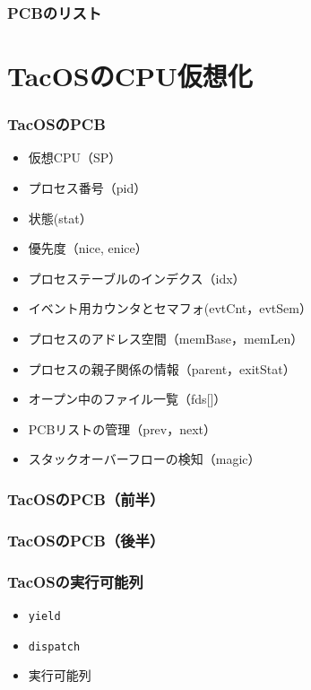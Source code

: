 \documentclass[unicode]{beamer}                   %
\begin{document}
\begin{frame}
  \frametitle{PCBのリスト}
\end{frame}

\section{TacOSのCPU仮想化}
\begin{frame}
  \frametitle{TacOSのPCB}
  \begin{itemize}
    \item 仮想CPU（SP）
    \item プロセス番号（pid）
    \item 状態(stat）
    \item 優先度（nice, enice）
    \item プロセステーブルのインデクス（idx）
    \item イベント用カウンタとセマフォ(evtCnt，evtSem）
    \item プロセスのアドレス空間（memBase，memLen）
    \item プロセスの親子関係の情報（parent，exitStat）
    \item オープン中のファイル一覧（fds[]）
    \item PCBリストの管理（prev，next）
    \item スタックオーバーフローの検知（magic）
  \end{itemize}
\end{frame}

\begin{frame}
  \frametitle{TacOSのPCB（前半）}
  \vspace{-5mm}
\end{frame}

\begin{frame}
  \frametitle{TacOSのPCB（後半）}
\end{frame}

\begin{frame}
  \frametitle{TacOSの実行可能列}
  \begin{itemize}
    \item {\tt yield}
    \item {\tt dispatch}
    \item 実行可能列
  \end{itemize}
\end{frame}
\end{document}

